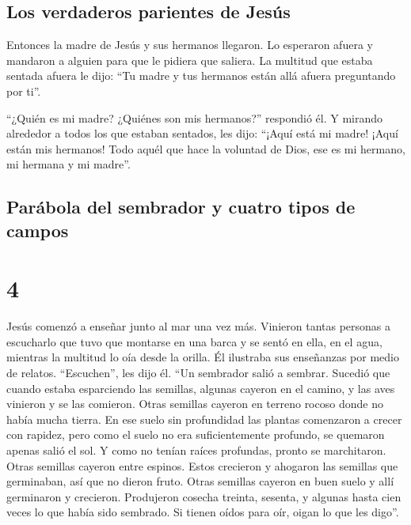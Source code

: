 \hypertarget{los-verdaderos-parientes-de-jesuxfas}{%
\subsection{Los verdaderos parientes de
Jesús}\label{los-verdaderos-parientes-de-jesuxfas}}

 Entonces la madre de Jesús y sus hermanos llegaron. Lo
esperaron afuera y mandaron a alguien para que le pidiera que saliera.
 La multitud que estaba sentada afuera le dijo: ``Tu
madre y tus hermanos están allá afuera preguntando por ti''.

 ``¿Quién es mi madre? ¿Quiénes son mis hermanos?''
respondió él.  Y mirando alrededor a todos los que
estaban sentados, les dijo: ``¡Aquí está mi madre! ¡Aquí están mis
hermanos!  Todo aquél que hace la voluntad de Dios, ese
es mi hermano, mi hermana y mi madre''.

\hypertarget{paruxe1bola-del-sembrador-y-cuatro-tipos-de-campos}{%
\subsection{Parábola del sembrador y cuatro tipos de
campos}\label{paruxe1bola-del-sembrador-y-cuatro-tipos-de-campos}}

\hypertarget{section-3}{%
\section{4}\label{section-3}}

 Jesús comenzó a enseñar junto al mar una vez más.
Vinieron tantas personas a escucharlo que tuvo que montarse en una barca
y se sentó en ella, en el agua, mientras la multitud lo oía desde la
orilla.  Él ilustraba sus enseñanzas por medio de relatos.
 ``Escuchen'', les dijo él. ``Un sembrador salió a
sembrar.  Sucedió que cuando estaba esparciendo las
semillas, algunas cayeron en el camino, y las aves vinieron y se las
comieron.  Otras semillas cayeron en terreno rocoso donde
no había mucha tierra. En ese suelo sin profundidad las plantas
comenzaron a crecer con rapidez, pero como el suelo no era
suficientemente profundo,  se quemaron apenas salió el
sol. Y como no tenían raíces profundas, pronto se marchitaron.
 Otras semillas cayeron entre espinos. Estos crecieron y
ahogaron las semillas que germinaban, así que no dieron fruto.
 Otras semillas cayeron en buen suelo y allí germinaron y
crecieron. Produjeron cosecha treinta, sesenta, y algunas hasta cien
veces lo que había sido sembrado.  Si tienen oídos para
oír, oigan lo que les digo''.

